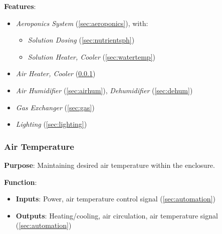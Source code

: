 \documentclass{report}
\begin{document}
\textbf{Features}:
\begin{itemize}
    \item \textit{Aeroponics System} (\ref{sec:aeroponics}), with:
    \begin{itemize}
        \item \textit{Solution Dosing} (\ref{sec:nutrientsph})
        \item \textit{Solution Heater, Cooler} (\ref{sec:watertemp})
    \end{itemize}
    \item \textit{Air Heater, Cooler} (\ref{sec:airtemp})
    \item \textit{Air Humidifier} (\ref{sec:airhum}), \textit{Dehumidifier} (\ref{sec:dehum})
    \item \textit{Gas Exchanger} (\ref{sec:gas})
    \item \textit{Lighting} (\ref{sec:lighting})
\end{itemize}

\newpage

\subsubsection{Air Temperature}
\label{sec:airtemp}

\textbf{Purpose}: Maintaining desired air temperature within the enclosure.

\textbf{Function}:
\begin{itemize}
    \item \textbf{Inputs}: Power, air temperature control signal (\ref{sec:automation})
    \item \textbf{Outputs}: Heating/cooling, air circulation, air temperature signal (\ref{sec:automation})
\end{itemize}
\end{document}
